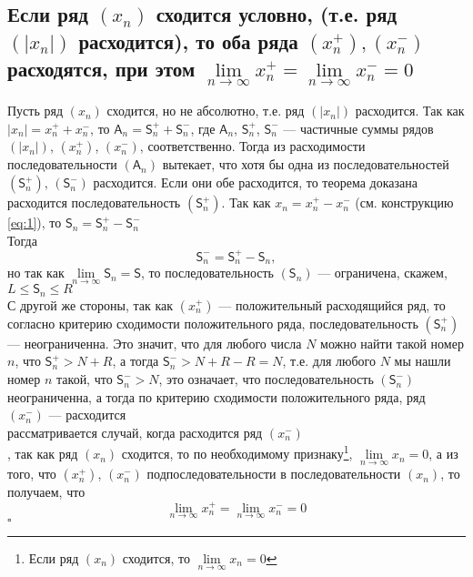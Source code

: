 \documentclass[a4paper]{article}
\newcommand{\qed}{\hfill$\square$}
\begin{document}
\subsection{Если ряд $(x_n)$ сходится условно, (т.е. ряд $(|x_n|)$ расходится), то оба ряда $(x_n^+),(x_n^-)$ расходятся, при этом $\lim\limits_{n\rightarrow\infty} x_n^+=\lim\limits_{n\rightarrow\infty} x_n^-=0$}
\label{2.4}
Пусть ряд $(x_n)$ сходится, но не абсолютно, т.е. ряд $(|x_n|)$ расходится. Так как $|x_n| = x_n^+ + x_n^-$, то $\mathsf{A}_n = \mathsf{S}_n^+ + \mathsf{S}_n^-$, где $\mathsf{A}_n$, $\mathsf{S}_n^+$, $\mathsf{S}_n^-$ — частичные суммы рядов $(|x_n|)$, $(x_n^+)$, $(x_n^-)$, соответственно. Тогда из расходимости последовательности $(\mathsf{A}_n)$ вытекает, что хотя бы одна из последовательностей $(\mathsf{S}_n^+)$, $(\mathsf{S}_n^-)$ расходится. Если они обе расходится, то теорема доказана\\[2mm]
 расходится последовательность $(\mathsf{S}_n^+)$. Так как $x_n = x_n^+ - x_n^-$ (см. конструкцию \ref{eq:1}), то $\mathsf{S}_n = \mathsf{S}_n^+ - \mathsf{S}_n^-$\\[2mm]
Тогда
$$
\mathsf{S}_n^- = \mathsf{S}_n^+ - \mathsf{S}_n,
$$
но так как $\lim\limits_{n \to \infty} \mathsf{S}_n = \mathsf{S}$, то последовательность $(\mathsf{S}_n)$ — ограничена, скажем, $L \leqslant \mathsf{S}_n \leqslant R$\\[2mm]
\indent С другой же стороны, так как $(x_n^+)$ — положительный расходящийся ряд, то согласно критерию сходимости положительного ряда, последовательность $(\mathsf{S}_n^+)$ — неограниченна. Это значит, что для любого числа $N$ можно найти такой номер $n$, что $\mathsf{S}_n^+ >N+R$, а тогда $\mathsf{S}_n^- > N+R-R =N$, т.е. для любого $N$ мы нашли номер $n$ такой, что $\mathsf{S}_n^- >N$, это означает, что последовательность $(\mathsf{S}_n^-)$ неограниченна, а тогда по критерию сходимости положительного ряда, ряд $(x_n^-)$ — расходится\\[2mm]
 рассматривается случай, когда расходится ряд $(x_n^-)$\\[2mm]
, так как ряд $(x_n)$ сходится, то по необходимому признаку\footnote{Если ряд $(x_n)$ сходится, то $\lim\limits_{n\rightarrow\infty} x_n=0$}, $\lim\limits_{n \to \infty} x_n = 0$, а из того, что $(x_n^+)$, $(x_n^-)$ подпоследовательности в последовательности $(x_n)$, то получаем, что $$\lim\limits_{n \to \infty} x_n^+ = \lim\limits_{n \to \infty} x_n^- = 0$$\qed
\end{document}

